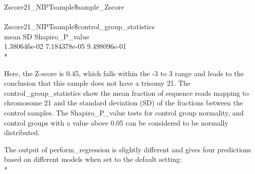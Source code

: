 \selectfont %
\footnotesize %
\noindent Zscore21\_NIPTsample\$sample\_Zscore \\
 \medskip\\
Zscore21\_NIPTsample\$control\_group\_statistics \\
mean \hspace{20mm} SD \hspace{22mm} Shapiro\_P\_value  \\
1.380646e-02 \hspace{7mm} 7.184378e-05 \hspace{5mm} 9.498096e-01 \\*
\selectfont %
\normalsize %

Here, the Z-score is 0.45, which falls within the -3 to 3 range and leads to the conclusion that this sample does not have a trisomy 21. 
The control\_group\_statistics show the mean fraction of sequence reads mapping to chromosome 21 and the standard deviation (SD) of the fractions between the control samples. 
The Shapiro\_P\_value tests for control group normality, and control groups with a value above 0.05 can be considered to be normally distributed.



The output of perform\_regression is slightly different and gives four predictions based on different models when set to the default setting: \\*

